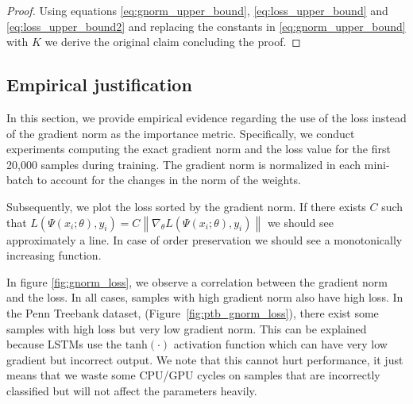 \documentclass{article}
\newcommand{\norm}[1]{\left\lVert #1 \right\rVert}
\begin{document}
\begin{proof}
Using equations \ref{eq:gnorm_upper_bound}, \ref{eq:loss_upper_bound} and
\ref{eq:loss_upper_bound2} and replacing the constants in
\ref{eq:gnorm_upper_bound} with $K$ we derive the original claim concluding the
proof.
\end{proof}

\subsection{Empirical justification} \label{sec:empirical}

In this section, we provide empirical evidence regarding the use of the loss
instead of the gradient norm as the importance metric. Specifically, we conduct
experiments computing the exact gradient norm and the loss value for the first
20,000 samples during training. The gradient norm is normalized in each
mini-batch to account for the changes in the norm of the weights.

Subsequently, we plot the loss sorted by the gradient norm. If there exists $C$
such that $L(\Psi(x_i; \theta), y_i) = C \norm{\nabla_{\theta} L(\Psi(x_i;
\theta), y_i)}$ we should see approximately a line. In case of order
preservation we should see a monotonically increasing function.

\begin{figure*}
    \caption{Loss values sorted by gradient norm. The solid line is a moving
    average ($50$ samples window) and the shaded area denotes one standard
    deviation.} \label{fig:gnorm_loss}
\end{figure*}

In figure \ref{fig:gnorm_loss}, we observe a correlation between the gradient
norm and the loss. In all cases, samples with high gradient norm also have high
loss. In the Penn Treebank dataset, (Figure~\ref{fig:ptb_gnorm_loss}), there
exist some samples with high loss but very low gradient norm. This can be
explained because LSTMs use the $\text{tanh}(\cdot)$ activation function which
can have very low gradient but incorrect output. We note that this cannot hurt
performance, it just means that we waste some CPU/GPU cycles on samples that are
incorrectly classified but will not affect the parameters heavily.
\end{document}
